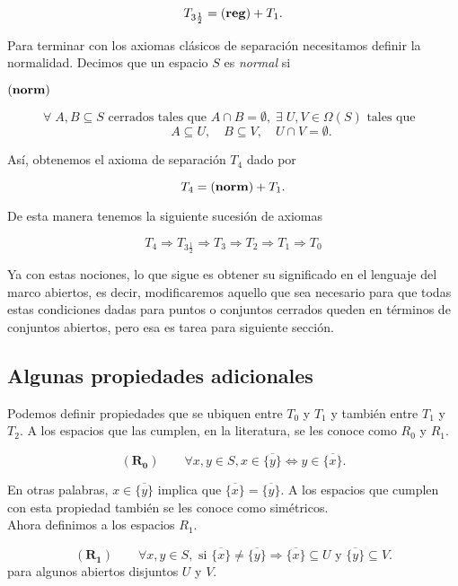 \documentclass{comunicaciones}
\begin{document}
\[
T_{3\frac{1}{2}}=(\mbox{\textbf{reg}}) + T_1.
\]

Para terminar con los axiomas clásicos de separación necesitamos definir la normalidad. Decimos que un espacio $S$ es \emph{normal} si 

\begin{description}
\item[$(\mbox{\textbf{norm}})$] $\forall\; A, B\subseteq S \mbox{ cerrados tales que } A\cap B=\emptyset,\; \exists\; U, V\in \Omega (S) \mbox{ tales que }$
\[
A\subseteq U,\quad B\subseteq V, \quad U\cap V=\emptyset.
\]
\end{description}

Así, obtenemos el axioma de separación $T_4$ dado por

\[
T_4=(\mbox{\textbf{norm}}) + T_1.
\]

De esta manera tenemos la siguiente sucesión de axiomas

\[
T_4\Rightarrow  T_{3\frac{1}{2}} \Rightarrow T_3 \Rightarrow T_2 \Rightarrow T_1 \Rightarrow T_0
\]

Ya con estas nociones, lo que sigue es obtener su significado en el lenguaje del marco abiertos, es decir, modificaremos aquello que sea necesario para que todas estas condiciones dadas para puntos o conjuntos cerrados queden en términos de conjuntos abiertos, pero esa es tarea para siguiente sección.

\subsection{Algunas propiedades adicionales}
Podemos definir propiedades que se ubiquen entre $T_0$ y $T_1$ y también entre $T_1$ y $T_2$. A los espacios que las cumplen, en la literatura, se les conoce como $R_0$ y $R_1$. 

\[
(\mathbf{R_0})\qquad \forall x, y\in S, x\in \overline{\{y\}} \Leftrightarrow y\in \overline{\{x\}}.
\]

En otras palabras, $x\in \overline{\{y\}}$ implica que $\overline{\{x\}}=\overline{\{y\}}$. A los espacios que cumplen con esta propiedad también se les conoce como simétricos.\\

Ahora definimos a los espacios $R_1$.

\[
(\mathbf{R_1})\qquad \forall x, y\in S, \mbox{ si } \overline{\{x\}}\neq \overline{\{y\}} \Rightarrow \overline{\{x\}}\subseteq U \mbox{ y } \overline{\{y\}}\subseteq V.
\]
para algunos abiertos disjuntos $U$ y $V$.\\
\end{document}
